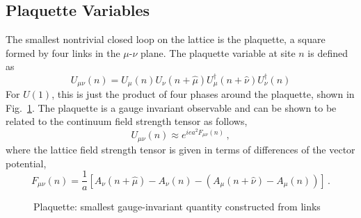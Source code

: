 \documentclass[11pt]{article}
\newcommand{\sidefact}[1]{\marginnote{\footnotesize\textcolor{green!50!black}{#1}}}
\newcommand{\sideex}[1]{\marginnote{\footnotesize\textcolor{red!50!black}{#1}}}
\theoremstyle{definition}
\begin{document}
\subsection*{Plaquette Variables}
The smallest nontrivial closed loop on the lattice is the plaquette, a square formed by four links in the $\mu$-$\nu$ plane. The plaquette variable at site $n$ is defined as \sidefact{For non-abelian gauge theories like $SU(N)$, it is a product of matrices and one needs to take a trace over the product to recover gauge invariance.}
\begin{equation}\label{eqn:plaq}
    U_{\mu\nu}(n) = U_{\mu}(n) U_{\nu}(n+\hat{\mu})U^{\dagger}_{\mu}(n+\hat{\nu})U^{\dagger}_{\nu}(n)
\end{equation}
For $U(1)$, this is just the product of four phases around the plaquette, shown in Fig.~\ref{fig:Plaquette}. The plaquette is a gauge invariant observable and can be shown to be related to the continuum field strength tensor as follows, \sideex{This is part of an exercise in the next sheet.}
\begin{equation}\label{eqn:plaq_fmunu}
    U_{\mu\nu}(n) \approx e^{i e a^2 F_{\mu \nu} (n)}\,,
\end{equation}
where the lattice field strength tensor is given in terms of differences of the vector potential,
\begin{equation}\label{eqn:disc_fmunu}
    F_{\mu \nu}(n) = \frac{1}{a} \left[ A_{\nu}(n+\hat{\mu}) - A_{\nu}(n) - (A_{\mu}(n+\hat{\nu}) - A_{\mu}(n)) \right] \,.
\end{equation}
\begin{figure}[h]
    \centering
    \caption{Plaquette: smallest gauge-invariant quantity constructed from links}
    \label{fig:Plaquette}
\end{figure}
\end{document}
